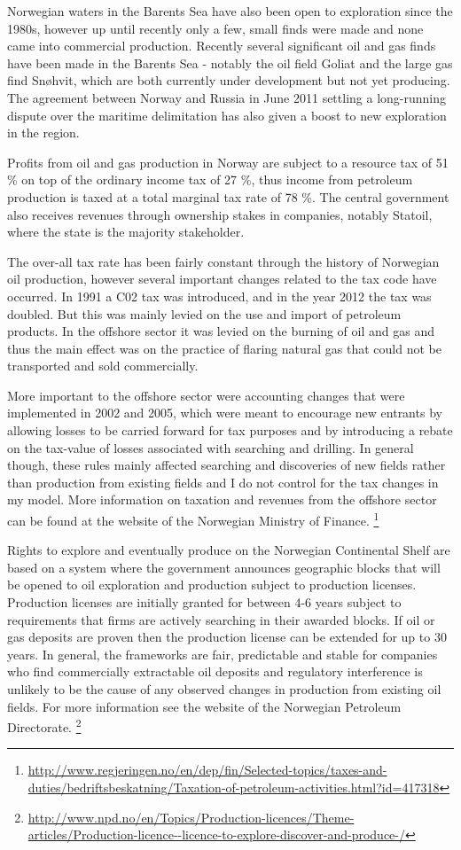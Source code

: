 \documentclass[11pt]{article}
\begin{document}
Norwegian waters in the Barents Sea have also been open to exploration since the 1980s, however up until recently only a few, small finds were made and none came into commercial production.  Recently several significant oil and gas finds have been made in the Barents Sea - notably the oil field Goliat and the large gas find Sn\o hvit, which are both currently under development but not yet producing.  The agreement between Norway and Russia in June 2011 settling a long-running dispute over the maritime delimitation has also given a boost to new exploration in the region.  

Profits from oil and gas production in Norway are subject to a resource tax of 51 \% on top of the ordinary income tax of 27 \%, thus income from petroleum production is taxed at a total marginal tax rate of 78 \%.  The central government also receives revenues through ownership stakes in companies, notably Statoil, where the state is the majority stakeholder.  

The over-all tax rate has been fairly constant through the history of Norwegian oil production, however several important changes related to the tax code have occurred.  In 1991 a C02 tax was introduced, and in the year 2012 the tax was doubled.  But this was mainly levied on the use and import of petroleum products.  In the offshore sector it was levied on the burning of oil and gas and thus the main effect was on the practice of flaring natural gas that could not be transported and sold commercially.

More important to the offshore sector were accounting changes that were implemented in 2002 and 2005, which were meant to encourage new entrants by allowing losses to be carried forward for tax purposes and by introducing a rebate on the tax-value of losses associated with searching and drilling.  In general though, these rules mainly affected searching and discoveries of new fields rather than production from existing fields and I do not control for the tax changes in my model.  More information on taxation and revenues from the offshore sector can be found at the website of the Norwegian Ministry of Finance. \footnote{\url{http://www.regjeringen.no/en/dep/fin/Selected-topics/taxes-and-duties/bedriftsbeskatning/Taxation-of-petroleum-activities.html?id=417318}}

Rights to explore and eventually produce on the Norwegian Continental Shelf are based on a system where the government announces geographic blocks that will be opened to oil exploration and production subject to production licenses.  Production licenses are initially granted for between 4-6 years subject to requirements that firms are actively searching in their awarded blocks.  If oil or gas deposits are proven then the production license can be extended for up to 30 years.  In general, the frameworks are fair, predictable and stable for companies who find commercially extractable oil deposits and regulatory interference is unlikely to be the cause of any observed changes in production from existing oil fields.  For more information see the website of the Norwegian Petroleum Directorate. \footnote{\url{http://www.npd.no/en/Topics/Production-licences/Theme-articles/Production-licence--licence-to-explore-discover-and-produce-/}}
\end{document}
